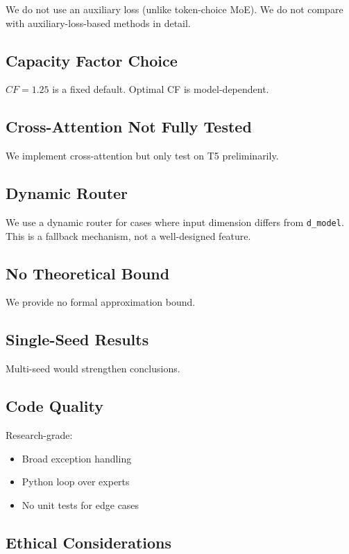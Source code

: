 We do not use an auxiliary loss (unlike token-choice MoE). We do not 
compare with auxiliary-loss-based methods in detail.

\subsection{Capacity Factor Choice}

$CF = 1.25$ is a fixed default. Optimal CF is 
model-dependent.

\subsection{Cross-Attention Not Fully Tested}

We implement cross-attention but only test on T5 preliminarily.

\subsection{Dynamic Router}

We use a dynamic router for cases where input dimension differs from 
\texttt{d\_model}. This is a fallback mechanism, not a well-designed feature.

\subsection{No Theoretical Bound}

We provide no formal approximation bound.

\subsection{Single-Seed Results}

Multi-seed would strengthen conclusions.

\subsection{Code Quality}

Research-grade:
\begin{itemize}
\item Broad exception handling
\item Python loop over experts
\item No unit tests for edge cases

\end{itemize}
\subsection{Ethical Considerations}

